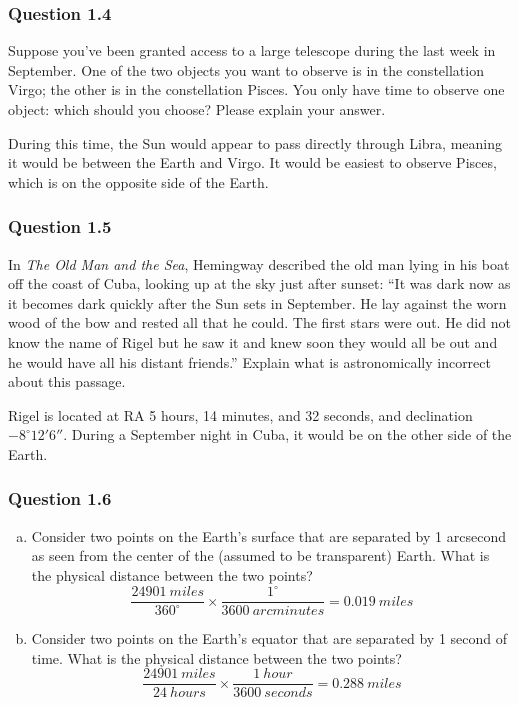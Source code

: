 \documentclass{math}
\begin{document}
\subsubsection*{Question 1.4}
Suppose you've been granted access to a large telescope during the last week in
September. One of the two objects you want to observe is in the constellation
Virgo; the other is in the constellation Pisces. You only have time to observe
one object: which should you choose? Please explain your answer. \par
During this time, the Sun would appear to pass directly through Libra, meaning
it would be between the Earth and Virgo. It would be easiest to observe Pisces,
which is on the opposite side of the Earth.

\subsubsection*{Question 1.5}
In \textit{The Old Man and the Sea}, Hemingway described the old man lying in
his boat off the coast of Cuba, looking up at the sky just after sunset: ``It
was dark now as it becomes dark quickly after the Sun sets in September. He lay
against the worn wood of the bow and rested all that he could. The first stars
were out. He did not know the name of Rigel but he saw it and knew soon they
would all be out and he would have all his distant friends.'' Explain what is
astronomically incorrect about this passage. \par
Rigel is located at RA 5 hours, 14 minutes, and 32 seconds, and declination
\( -8^{\circ}12'6'' \). During a September night in Cuba, it would be on the
other side of the Earth.

\subsubsection*{Question 1.6}
\begin{enumerate}[(a)]
  \item Consider two points on the Earth's surface that are separated by 1
    arcsecond as seen from the center of the (assumed to be transparent) Earth.
    What is the physical distance between the two points?
    \[ \frac{24901~miles}{360^{\circ}}\times\frac{1^{\circ}}{3600~arcminutes} =
      0.019~miles \]
  \item Consider two points on the Earth's equator that are separated by 1
    second of time. What is the physical distance between the two points?
    \[ \frac{24901~miles}{24~hours}\times\frac{1~hour}{3600~seconds} =
      0.288~miles\]
\end{enumerate}
\end{document}
